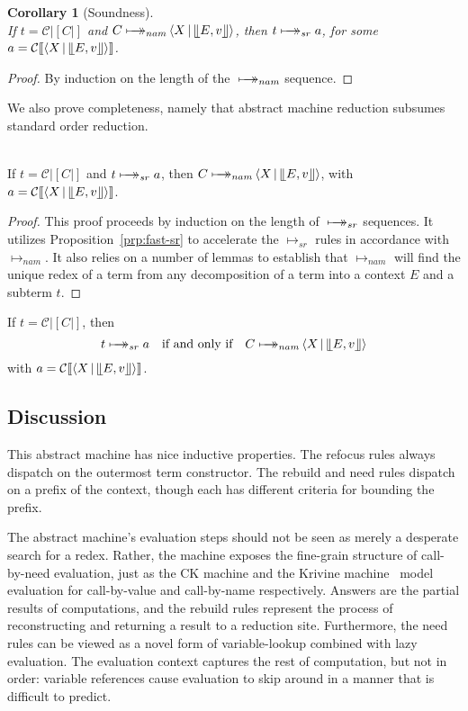 \documentclass{LMCS}
\newcommand{\mtoc}[0]{\mathcal{C}}
\theoremstyle{plain}
\newtheorem{corollary}[theorem]{Corollary}
\theoremstyle{remark}
\newcommand{\mapsTo}[0]{\mbox{\ensuremath{\makebox[0pt][l]{\hspace{7pt}$\rightarrow$}\longmapsto}}}
\newcommand{\nam}[0]{\ensuremath{\longmapsto_{nam}}}
\newcommand{\Nam}[0]{\ensuremath{\mapsTo_{nam}}}
\newcommand{\sr}[0]{\ensuremath{\longmapsto_{sr}}}
\newcommand{\Sr}[0]{\ensuremath{\mapsTo_{sr}}}
\newcommand{\answer}[1]{\llfloor#1\rrfloor}
\begin{document}
\begin{corollary}[Soundness]\mbox{}\\
  If $t = \mtoc|[C|]$ and $C \Nam \Braket{X|\answer{E,v}}$, then
  $t \Sr\; a$, for some $a = \mtoc|[\Braket{X|\answer{E,v}}|]$.
\end{corollary}
\begin{proof}
  By induction on the length of the $\Nam$ sequence. 
\end{proof}

We also prove completeness, namely that abstract machine reduction subsumes
standard order reduction.  

\begin{thm}[Completeness]\mbox{}\\
  If $t = \mtoc|[C|]$ and $t \Sr\; a$, then $C \Nam \Braket{X|\answer{E,v}}$,
  with $a = \mtoc|[\Braket{X|\answer{E,v}}|]$.
\end{thm}
\begin{proof}
  This proof proceeds by induction on the length of $\Sr$ sequences.
  It utilizes Proposition~\ref{prp:fast-sr} to accelerate the $\sr$ rules
  in accordance with $\nam$.  It also relies on a number of lemmas to
  establish that $\nam$ will find the unique redex of a term from any
  decomposition of a term into a context $E$ and a subterm $t$.
\end{proof}

\begin{thm}[Correctness]
  If $t = \mtoc|[C|]$, then 
\[t \Sr\; a\quad\hbox{if and only if}\quad C \Nam
  \Braket{X|\answer{E,v}}
\]
with $a = \mtoc|[\Braket{X|\answer{E,v}}|]$.
\end{thm}


\subsection{Discussion}

This abstract machine has nice inductive properties.  The refocus rules always
dispatch on the outermost term constructor.  The rebuild and need rules
dispatch on a prefix of the context, though each has different criteria
for bounding the prefix.

The abstract machine's evaluation steps should not be seen as merely a
desperate search for a redex.  Rather, the machine exposes the fine-grain
structure of call-by-need evaluation, just as the CK machine and the Krivine
machine~\cite{krivine07machine} model evaluation for call-by-value and
call-by-name respectively.  Answers are the partial results of computations,
and the rebuild rules represent the process of reconstructing and
returning a result to a reduction site.  Furthermore, the need rules can be
viewed as a novel form of variable-lookup combined with lazy evaluation.
The evaluation context captures the rest of computation, but not in order:
variable references cause evaluation to skip around in a manner that is
difficult to predict. 
\end{document}
